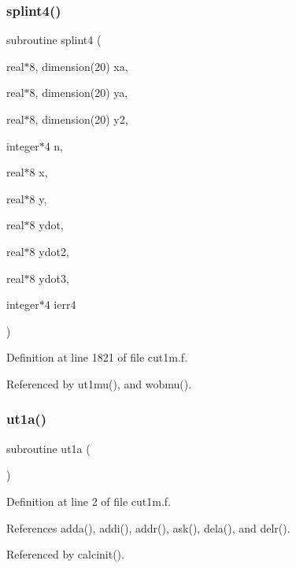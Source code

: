 \subsubsection{\texorpdfstring{splint4()}{splint4()}}
{\footnotesize\ttfamily subroutine splint4 (\begin{DoxyParamCaption}\item[{real$\ast$8, dimension(20)}]{xa,  }\item[{real$\ast$8, dimension(20)}]{ya,  }\item[{real$\ast$8, dimension(20)}]{y2,  }\item[{integer$\ast$4}]{n,  }\item[{real$\ast$8}]{x,  }\item[{real$\ast$8}]{y,  }\item[{real$\ast$8}]{ydot,  }\item[{real$\ast$8}]{ydot2,  }\item[{real$\ast$8}]{ydot3,  }\item[{integer$\ast$4}]{ierr4 }\end{DoxyParamCaption})}



Definition at line 1821 of file cut1m.\+f.



Referenced by ut1mu(), and wobmu().

\mbox{\label{cut1m_8f_ad2c010d077ecc104ddcc9ae29167c76b}} 
\subsubsection{\texorpdfstring{ut1a()}{ut1a()}}
{\footnotesize\ttfamily subroutine ut1a (\begin{DoxyParamCaption}{ }\end{DoxyParamCaption})}



Definition at line 2 of file cut1m.\+f.



References adda(), addi(), addr(), ask(), dela(), and delr().



Referenced by calcinit().

\mbox{\label{cut1m_8f_a6bb59e024b3a91ed736356a8c8fea840}} 
